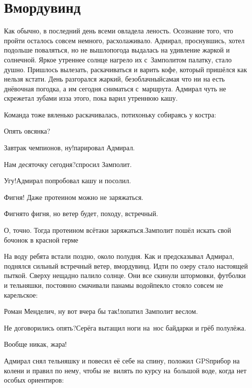 \chapter{Вмордувинд}
\vepsianrose

Как обычно, в последний день всеми овладела леность. Осознание того, что пройти осталось совсем немного, расхолаживало. Адмирал, проснувшись, хотел подольше поваляться, но не вышло\mdash погода выдалась на удивление жаркой и солнечной. Яркое утреннее солнце нагрело их с~Замполитом палатку, стало душно. Пришлось вылезать, раскачиваться и варить кофе, который пришёлся как нельзя кстати. День разгорался жаркий, безоблачный\mdash самая что ни на есть днёвочная погодка, а им сегодня сниматься с~маршрута. Адмирал чуть не скрежетал зубами из\sdash за этого, пока варил утреннюю кашу. 

Команда тоже вяленько раскачивалась, потихоньку собираясь у костра:

\diagdash Опять овсянка?

\diagdash Завтрак чемпионов, ну!\mdash парировал Адмирал.

\diagdash Нам десяточку сегодня?\mdash спросил Замполит.

\diagdash Угу!\mdash Адмирал попробовал кашу и посолил.

\diagdash Фигня! Даже протеином можно не заряжаться.

\diagdash Фигня\sdash то фигня, но ветер будет, походу, встречный. 

\diagdash О, точно. Тогда протеином всё\sdash таки заряжаться.\mdash Замполит пошёл искать свой бочонок в красной герме\myldots{}

\vspace{0.75em}

\myldots{}На воду ребята встали поздно, около полудня. Как и предсказывал Адмирал, поднялся сильный встречный ветер, вмордувинд. Идти по озеру стало настоящей пыткой. Сверху нещадно палило солнце. Они все скинули штормовки, футболки и тельняшки, постоянно смачивали панамы водой\mdash пекло стояло совсем не карельское:

\diagdash Роман Менделич, ну вот вчера бы так!\mdash лопатил Замполит веслом.  

\diagdash Не договорились опять?\mdash Серёга вытащил ноги на~нос байдарки и грёб полулёжа.

\diagdash Вообще никак, жара!

Адмирал снял тельняшку и повесил её себе на спину, положил GPS\sdash прибор на колени и правил по нему, чтобы не~вилять по курсу на~большой воде, когда нет особых ориентиров:

